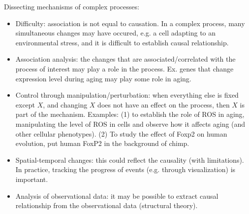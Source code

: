 \documentclass{report}
\begin{document}
Dissecting mechanisms of complex processes:
\begin{itemize}
\item Difficulty: association is not equal to causation. In a complex process, many simultaneous changes may have occured, e.g. a cell adapting to an environmental stress, and it is difficult to establish causal relationship. 

\item Association analysis: the changes that are associated/correlated with the process of interest may play a role in the process. Ex. genes that change expression level during aging may play some role in aging. 

\item Control through manipulation/perturbation: when everything else is fixed except $X$, and changing $X$ does not have an effect on the process, then $X$ is part of the mechanism. Examples: (1) to establish the role of ROS in aging, manipulating the level of ROS in cells and observe how it affects aging (and other cellular phenotypes). (2) To study the effect of Foxp2 on human evolution, put human FoxP2 in the background of chimp. 

\item Spatial-temporal changes: this could reflect the causality (with limitations). In practice, tracking the progress of events (e.g. through visualization) is important. 

\item Analysis of observational data: it may be possible to extract causal relationship from the observational data (structural theory). 

\end{itemize}
\end{document}
